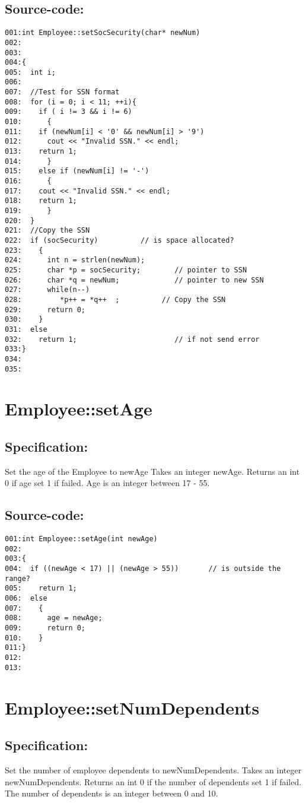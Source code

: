 \subsection*{Source-code:}
\begin{verbatim}
001:int Employee::setSocSecurity(char* newNum)
002:
003:     
004:{
005:  int i;
006:  
007:  //Test for SSN format
008:  for (i = 0; i < 11; ++i){
009:    if ( i != 3 && i != 6)
010:      {  
011:    if (newNum[i] < '0' && newNum[i] > '9')
012:      cout << "Invalid SSN." << endl;
013:    return 1;
014:      }
015:    else if (newNum[i] != '-')
016:      { 
017:    cout << "Invalid SSN." << endl; 
018:    return 1;
019:      }
020:  }
021:  //Copy the SSN
022:  if (socSecurity)          // is space allocated?
023:    {
024:      int n = strlen(newNum);
025:      char *p = socSecurity;        // pointer to SSN
026:      char *q = newNum;             // pointer to new SSN
027:      while(n--)
028:         *p++ = *q++  ;          // Copy the SSN
029:      return 0;
030:    }
031:  else
032:    return 1;                       // if not send error
033:}
034:
035:
\end{verbatim}
\section{Employee::setAge}
\subsection*{Specification:}
Set the age of the Employee to newAge
  Takes an integer newAge.
  Returns an int 0 if age set 1 if failed.
  Age is an integer between 17 - 55.
\subsection*{Source-code:}
\begin{verbatim}
001:int Employee::setAge(int newAge)    
002:  
003:{
004:  if ((newAge < 17) || (newAge > 55))       // is outside the range?
005:    return 1;                   
006:  else
007:    {
008:      age = newAge;         
009:      return 0;
010:    }
011:}
012:
013:
\end{verbatim}
\section{Employee::setNumDependents}
\subsection*{Specification:}
Set the number of employee dependents to newNumDependents.
  Takes an integer newNumDependents.
  Returns an int 0 if the number of dependents set 1 if failed.
  The number of dependents is an integer between 0 and 10.
